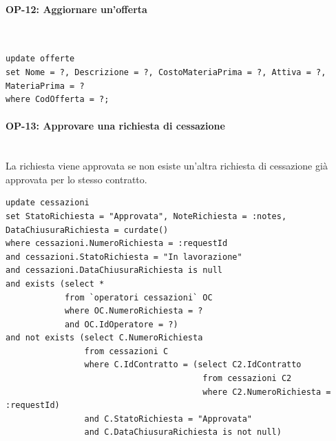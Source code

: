 \documentclass[a4paper,12pt]{report}
\begin{document}
\paragraph{OP-12: Aggiornare un'offerta}\mbox{}\\
\begin{lstlisting}
update offerte
set Nome = ?, Descrizione = ?, CostoMateriaPrima = ?, Attiva = ?, MateriaPrima = ?
where CodOfferta = ?;
\end{lstlisting}

\paragraph{OP-13: Approvare una richiesta di cessazione}\mbox{}\\
La richiesta viene approvata se non esiste un'altra richiesta di cessazione già approvata per lo stesso contratto.
\begin{lstlisting}
update cessazioni
set StatoRichiesta = "Approvata", NoteRichiesta = :notes, DataChiusuraRichiesta = curdate()
where cessazioni.NumeroRichiesta = :requestId
and cessazioni.StatoRichiesta = "In lavorazione"
and cessazioni.DataChiusuraRichiesta is null
and exists (select *
            from `operatori cessazioni` OC
            where OC.NumeroRichiesta = ?
            and OC.IdOperatore = ?)
and not exists (select C.NumeroRichiesta
                from cessazioni C
                where C.IdContratto = (select C2.IdContratto
                                        from cessazioni C2
                                        where C2.NumeroRichiesta = :requestId)
                and C.StatoRichiesta = "Approvata"
                and C.DataChiusuraRichiesta is not null)
\end{lstlisting}
\end{document}
